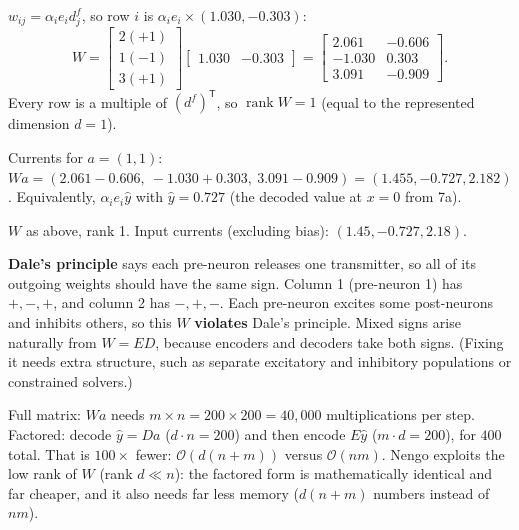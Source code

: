 \documentclass[10pt,letterpaper]{article}
\newcommand{\T}{\mathsf{T}}
\newcommand{\ans}[1]{\par\vspace{3pt}{\bfseries #1}\quad}
\begin{document}
\ans{7b.}
$w_{ij} = \alpha_i e_i d^f_j$, so row $i$ is $\alpha_i e_i \times (1.030, -0.303)$:
\[
W = \begin{bmatrix} 2(+1) \\ 1(-1) \\ 3(+1)\end{bmatrix}\begin{bmatrix} 1.030 & -0.303\end{bmatrix} = \begin{bmatrix} 2.061 & -0.606 \\ -1.030 & 0.303 \\ 3.091 & -0.909\end{bmatrix}.
\]
Every row is a multiple of $(d^f)^\T$, so $\operatorname{rank} W = 1$ (equal to the represented dimension $d = 1$).

Currents for $a = (1, 1)$: $Wa = (2.061 - 0.606,\ -1.030 + 0.303,\ 3.091 - 0.909) = (1.455, -0.727, 2.182)$. Equivalently, $\alpha_i e_i \hat y$ with $\hat y = 0.727$ (the decoded value at $x = 0$ from 7a).
\begin{result}
$W$ as above, rank 1. Input currents (excluding bias): $(1.45, -0.727, 2.18)$.
\end{result}
\textbf{Dale's principle} says each pre-neuron releases one transmitter, so all of its outgoing weights should have the same sign. Column 1 (pre-neuron 1) has $+, -, +$, and column 2 has $-, +, -$. Each pre-neuron excites some post-neurons and inhibits others, so this $W$ \textbf{violates} Dale's principle. Mixed signs arise naturally from $W = ED$, because encoders and decoders take both signs. (Fixing it needs extra structure, such as separate excitatory and inhibitory populations or constrained solvers.)

\ans{7c.}
Full matrix: $Wa$ needs $m \times n = 200 \times 200 = 40{,}000$ multiplications per step. Factored: decode $\hat y = Da$ ($d \cdot n = 200$) and then encode $E\hat y$ ($m \cdot d = 200$), for $400$ total. That is $100\times$ fewer: $\mathcal O(d(n+m))$ versus $\mathcal O(nm)$. Nengo exploits the low rank of $W$ (rank $d \ll n$): the factored form is mathematically identical and far cheaper, and it also needs far less memory ($d(n+m)$ numbers instead of $nm$).
\end{document}
